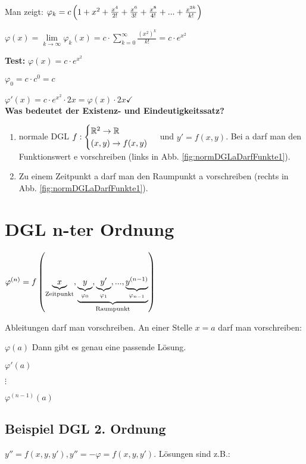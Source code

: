Man zeigt: $\varphi_k = c \left( 1 + x^2 + \frac{x^4}{2!} + \frac{x^6}{3!} + \frac{x^8}{4!} + ... + \frac{x^{2k}}{k!} \right) $

$\varphi(x) = \lim\limits_{k\rightarrow \infty} \varphi_k(x) = c\cdot \sum_{k=0}^{\infty} \frac{(x^2)^k}{k!} = c\cdot e^{x^2}$

\textbf{Test:} $\varphi(x) = c\cdot e^{x^2}$

$\varphi_0 = c\cdot c^0 = c$

$\varphi'(x) = c\cdot e^{x^2} \cdot 2x = \varphi(x) \cdot 2x \checkmark$\\

\textbf{Was bedeutet der Existenz- und Eindeutigkeitssatz?}
\begin{enumerate}
\item normale DGL 
$f: 
\begin{cases}
\mathbb{R}^2 \rightarrow \mathbb{R}\\
(x,y) \rightarrow f(x,y)
\end{cases}$ und $
y'=f(x,y)
$. Bei a darf man den Funktionswert e vorschreiben (links in Abb. \ref{fig:normDGLaDarfFunkte1}).
\item Zu einem Zeitpunkt a darf man den Raumpunkt a vorschreiben (rechts in Abb. \ref{fig:normDGLaDarfFunkte1}).
\end{enumerate}

\section{DGL n-ter Ordnung}
$
\varphi^{(n)} = f \left( \underbrace{x}_{\textrm{Zeitpunkt}}, \underbrace{\underbrace{y}_{\varphi_0}, \underbrace{y'}_{\varphi_1}, ..., \underbrace{y^{(n-1)}}_{\varphi_{n-1}}}_{\textrm{Raumpunkt}} \right)  
$

Ableitungen darf man vorschreiben. An einer Stelle $x = a$ darf man vorschreiben: 

$\varphi(a)$ Dann gibt es genau eine passende Lösung. 

$\varphi'(a)$

$\vdots$

$\varphi^{(n-1)}(a)$

\subsection{Beispiel DGL 2. Ordnung}
$y'' = f(x,y,y'), y'' = -\varphi = f(x,y,y')$. Lösungen sind z.B.:


